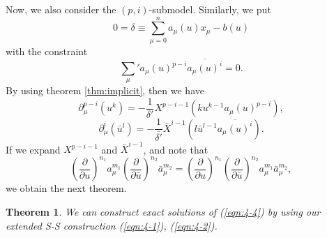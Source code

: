 \documentclass[makeidx,12pt,openany]{report}
\newtheorem{thm}[df]{Theorem}
\begin{document}
Now, we also consider the $(p,i)$-submodel. Similarly, we put 
\begin{equation}
 0=\delta \equiv \sum_{\mu =0}^n a_{\mu}(u)x_{\mu}-b(u)
 \label{eqn:4-1}
\end{equation}
with the constraint 
\begin{equation}
 \sum_{\mu}{}'a_{\mu}(u)^{p-i}\overline{a_{\mu}(u)^i}=0
 \label{eqn:4-2}. 
\end{equation}
By using theorem \ref{thm:implicit}, 
then 
we have 
\begin{equation}
 \partial_{\mu}^{p-i} (u^k) =
  -\frac{1}{\delta'} X^{p-i-1}
  (k u^{k-1} a_{\mu}(u)^{p-i}),
\end{equation}
\begin{equation}
 \partial_{\mu}^i (\bar{u}^l) =
  -\frac{1}{\bar{\delta'}} \bar{X}^{i-1}
  (l \bar{u}^{l-1} \overline{a_{\mu}(u)^i}). 
\end{equation}
If we expand $X^{p-i-1}$ and $\bar{X}^{i-1}$, and note that 
\begin{equation}
 \left( \frac{\partial}{\partial u} \right)^{n_1} a_{\mu}^{m_1}
 \left( \frac{\partial}{\partial \bar{u}} \right)^{n_2} \bar{a}_{\mu}^{m_2}
 =
 \left( \frac{\partial}{\partial u} \right)^{n_1} 
 \left( \frac{\partial}{\partial \bar{u}} \right)^{n_2} 
  a_{\mu}^{m_1} \bar{a}_{\mu}^{m_2},
\end{equation}
we obtain the next theorem.
\begin{thm}
We can construct exact solutions of (\ref{eqn:4-4}) by using our 
extended S-S construction (\ref{eqn:4-1}), (\ref{eqn:4-2}).
\end{thm}
\end{document}
